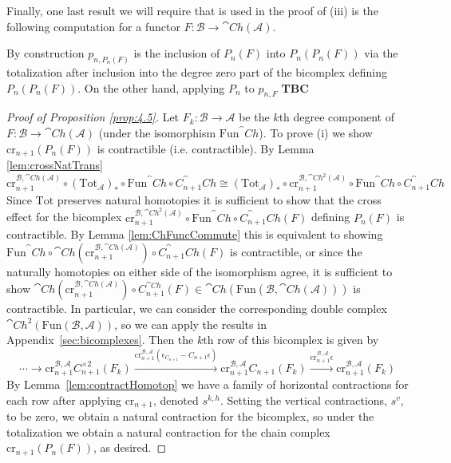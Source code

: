 Finally, one last result we will require that is used in the proof of (iii) is the following computation for a functor $F:\mathcal{B}\rightarrow \cat{Ch}(\mathcal{A})$.

\begin{rmk}
    By construction $p_{n,P_n(F)}$ is the inclusion of $P_n(F)$ into $P_n(P_n(F))$ via the totalization after inclusion into the degree zero part of the bicomplex defining $P_n(P_n(F))$. On the other hand, applying $P_n$ to $p_{n,F}$ \textbf{TBC}
\end{rmk}

\begin{proof}[Proof of Proposition \ref{prop:4.5}]
    Let $F_k:\mathcal{B}\rightarrow \mathcal{A}$ be the $k$th degree component of $F:\mathcal{B}\rightarrow \cat{Ch}(\mathcal{A})$ (under the isomorphism $\text{Fun}^\cat{Ch}$). To prove (i) we show $\text{cr}_{n+1}(P_n(F))$ is contractible (i.e.  contractible). By Lemma \ref{lem:crossNatTrans} 
    \begin{equation*}
        \text{cr}_{n+1}^{\mathcal{B},\cat{Ch}(\mathcal{A})}\circ (\text{Tot}_\mathcal{A})_*\circ \text{Fun}^\cat{Ch}\circ C_{n+1}^\cat{Ch} \cong (\text{Tot}_\mathcal{A})_*\circ \text{cr}_{n+1}^{\mathcal{B},\cat{Ch}^2(\mathcal{A})}\circ \text{Fun}^\cat{Ch}\circ C_{n+1}^\cat{Ch}
    \end{equation*}
    Since $\text{Tot}$ preserves natural homotopies it is sufficient to show that the cross effect for the bicomplex $\text{cr}_{n+1}^{\mathcal{B},\cat{Ch}^2(\mathcal{A})}\circ \text{Fun}^\cat{Ch}\circ C_{n+1}^\cat{Ch}(F)$ defining $P_n(F)$ is contractible. By Lemma \ref{lem:ChFuncCommute} this is equivalent to showing $\text{Fun}^\cat{Ch}\circ\cat{Ch}(\text{cr}_{n+1}^{\mathcal{B},\cat{Ch}(\mathcal{A})})\circ C_{n+1}^\cat{Ch}(F)$ is contractible, or since the naturally homotopies on either side of the isomorphism agree, it is sufficient to show $\cat{Ch}(\text{cr}_{n+1}^{\mathcal{B},\cat{Ch}(\mathcal{A})})\circ C^{\cat{Ch}}_{n+1}(F) \in \cat{Ch}(\text{Fun}(\mathcal{B},\cat{Ch}(\mathcal{A})))$ is contractible. In particular, we can consider the corresponding double complex $\cat{Ch}^2(\text{Fun}(\mathcal{B},\mathcal{A}))$, so we can apply the results in Appendix~\ref{sec:bicomplexes}. Then the $k$th row of this bicomplex is given by
    \begin{equation*}
        \cdots \rightarrow\text{cr}_{n+1}^{\mathcal{B},\mathcal{A}}C_{n+1}^{\times2}(F_k)\xrightarrow{\text{cr}_{n+1}^{\mathcal{B},\mathcal{A}}(\epsilon_{C_{n+1}}-C_{n+1}\epsilon)}\text{cr}_{n+1}^{\mathcal{B},\mathcal{A}}C_{n+1}(F_k)\xrightarrow{\text{cr}_{n+1}^{\mathcal{B},\mathcal{A}}\epsilon}\text{cr}_{n+1}^{\mathcal{B},\mathcal{A}}(F_k)
    \end{equation*}
    By Lemma~\ref{lem:contractHomotop} we have a family of horizontal contractions for each row after applying $\text{cr}_{n+1}$, denoted $s^{k,h}$. Setting the vertical contractions, $s^v$, to be zero, we obtain a natural contraction for the bicomplex, so under the totalization we obtain a natural contraction for the chain complex $\text{cr}_{n+1}(P_n(F))$, as desired. 


\end{proof}

